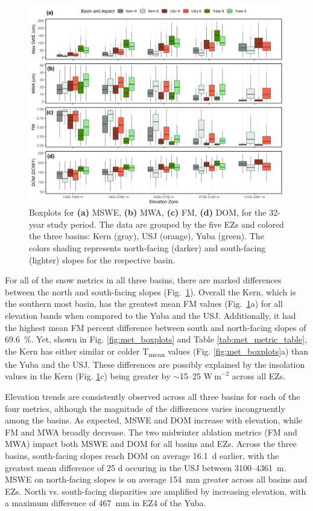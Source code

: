 \begin{figure}[t]
\includegraphics[width=\textwidth]{figures/ch2_figs/snow4_boxplot_v5.png}
\caption{Boxplots for \textbf{(a)} MSWE, \textbf{(b)} MWA, \textbf{(c)} FM, \textbf{(d)} DOM, for the 32-year study period. The data are grouped by the five EZs and colored the three basins: Kern (gray), USJ (orange), Yuba (green). The colors shading represents north-facing (darker) and south-facing (lighter) slopes for the respective basin.}
\label{fig:snow_boxplots}
\end{figure}


For all of the snow metrics in all three basins, there are marked differences between the north and south-facing slopes (Fig.~\ref{fig:snow_boxplots}). Overall the Kern, which is the southern most basin, has the greatest mean FM values (Fig.~\ref{fig:snow_boxplots}a) for all elevation bands when compared to the Yuba and the USJ. Additionally, it had the highest mean FM percent difference between south and north-facing slopes of 69.6~\%. Yet, shown in Fig. \ref{fig:met_boxplots} and Table \ref{tab:met_metric_table}, the Kern has either similar or colder T\textsubscript{mean} values (Fig. \ref{fig:met_boxplots}a) than the Yuba and the USJ. These differences are possibly explained by the insolation values in the Kern (Fig. \ref{fig:snow_boxplots}c) being greater by $\sim$15--25 $\mathrm{W~m}^{-2}$ across all EZs. 

Elevation trends are consistently observed across all three basins for each of the four metrics, although the magnitude of the differences varies incongruently among the basins. As expected, MSWE and DOM increase with elevation, while FM and MWA broadly decrease. The two midwinter ablation metrics (FM and MWA) impact both MSWE and DOM for all basins and EZs. Across the three basins, south-facing slopes reach DOM on average 16.1~d earlier, with the greatest mean difference of 25 d occuring in the USJ between 3100--4361~m. MSWE on north-facing slopes is on average 154~mm greater across all basins and EZs. North vs. south-facing disparities are amplified by increasing elevation, with a maximum difference of 467~mm in EZ4 of the Yuba.

